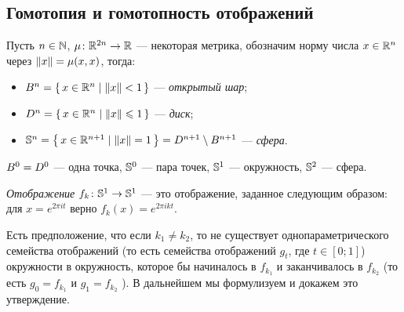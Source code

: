 \documentclass[main]{subfiles}
\begin{document}
\subsection{Гомотопия и гомотопность отображений}

\begin{definition} Пусть $ n \in \N $, $ \mu \colon \R^{2 n} \to \R $ --- некоторая метрика, обозначим норму числа
	$ x \in \R^n $ через $ \Norm{x} = \mu(x, x) $, тогда:
	\begin{itemize}
		\item $ \B^n = \Set{ x \in \R^n \mid \Norm{x} < 1 } $ --- \emph{открытый шар};
		\item $ \D^n = \Set{ x \in \R^n \mid \Norm{x} \Le 1 } $ --- \emph{диск};
		\item $ \S^n = \Set{ x \in \R^{n+1} \mid \Norm{x} = 1 } = \D^{n+1} \wo \B^{n+1} $ --- \emph{сфера}.
	\end{itemize}
\end{definition}

\begin{remark}
	$ \B^0 = \D^0 $ --- одна точка, $ \S^0 $ --- пара точек, $ \S^1 $ --- окружность, $ \S^2 $ --- сфера.
\end{remark}

\begin{definition}
	\emph{Отображение $ f_k \colon \S^1 \to \S^1 $} --- это отображение, заданное следующим образом: для
	$ x = e^{2\pi i t} $ верно $ f_k(x) = e^{2 \pi i k t} $.
\end{definition}

Есть предположение, что если $ k_1 \neq k_2 $, то не существует однопараметрического семейства отображений (то есть
семейства отображений $ g_t $, где $ t \in [0; 1] $) окружности в окружность, которое бы начиналось в $ f_{k_1} $ и
заканчивалось в $ f_{k_2} $ (то есть $ g_0 = f_{k_1} $ и $ g_1 = f_{k_2} $ ). В дальнейшем мы формулизуем и докажем
это утверждение.
\end{document}
